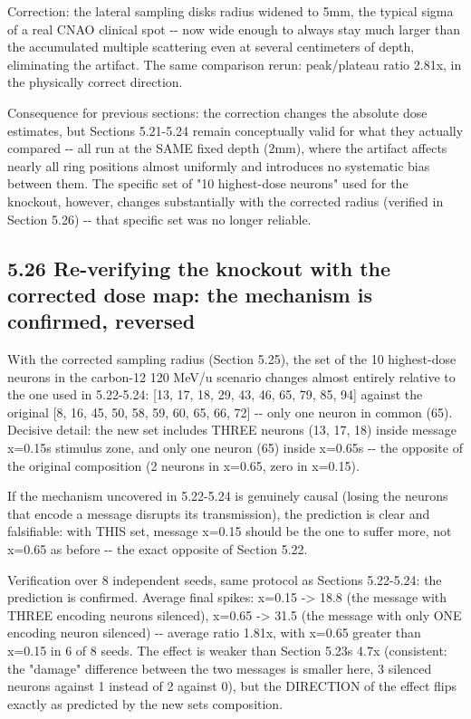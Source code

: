 \documentclass[
  english,
]{article}
\begin{document}
Correction: the lateral sampling disk\textquotesingle s radius widened to 5mm, the typical sigma of a real CNAO clinical spot -\/- now wide enough to always stay much larger than the accumulated multiple scattering even at several centimeters of depth, eliminating the artifact. The same comparison rerun: peak/plateau ratio 2.81x, in the physically correct direction.

Consequence for previous sections: the correction changes the absolute dose estimates, but Sections 5.21-5.24 remain conceptually valid for what they actually compared -\/- all run at the SAME fixed depth (2mm), where the artifact affects nearly all ring positions almost uniformly and introduces no systematic bias between them. The specific set of "10 highest-dose neurons" used for the knockout, however, changes substantially with the corrected radius (verified in Section 5.26) -\/- that specific set was no longer reliable.

\subsection{5.26 Re-verifying the knockout with the corrected dose map: the mechanism is confirmed, reversed}\label{re-verifying-the-knockout-with-the-corrected-dose-map-the-mechanism-is-confirmed-reversed}

With the corrected sampling radius (Section 5.25), the set of the 10 highest-dose neurons in the carbon-12 120 MeV/u scenario changes almost entirely relative to the one used in 5.22-5.24: {[}13, 17, 18, 29, 43, 46, 65, 79, 85, 94{]} against the original {[}8, 16, 45, 50, 58, 59, 60, 65, 66, 72{]} -\/- only one neuron in common (65). Decisive detail: the new set includes THREE neurons (13, 17, 18) inside message x=0.15\textquotesingle s stimulus zone, and only one neuron (65) inside x=0.65\textquotesingle s -\/- the opposite of the original composition (2 neurons in x=0.65, zero in x=0.15).

If the mechanism uncovered in 5.22-5.24 is genuinely causal (losing the neurons that encode a message disrupts its transmission), the prediction is clear and falsifiable: with THIS set, message x=0.15 should be the one to suffer more, not x=0.65 as before -\/- the exact opposite of Section 5.22.

Verification over 8 independent seeds, same protocol as Sections 5.22-5.24: the prediction is confirmed. Average final spikes: x=0.15 -\textgreater{} 18.8 (the message with THREE encoding neurons silenced), x=0.65 -\textgreater{} 31.5 (the message with only ONE encoding neuron silenced) -\/- average ratio 1.81x, with x=0.65 greater than x=0.15 in 6 of 8 seeds. The effect is weaker than Section 5.23\textquotesingle s 4.7x (consistent: the "damage" difference between the two messages is smaller here, 3 silenced neurons against 1 instead of 2 against 0), but the DIRECTION of the effect flips exactly as predicted by the new set\textquotesingle s composition.
\end{document}

